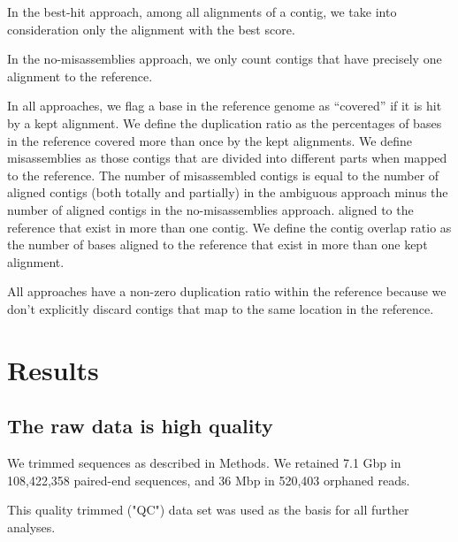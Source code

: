 \documentclass[10pt,a4paper,twocolumn]{article}
\begin{document}
In the best-hit approach, among all alignments of a contig, we take
into consideration only the alignment with the best score.

In the no-misassemblies approach, we only count contigs that have
precisely one alignment to the reference.

In all approaches, we flag a base in the reference genome as
``covered'' if it is hit by a kept alignment.  We define the
duplication ratio as the percentages of bases in the reference covered
more than once by the kept alignments. We define misassemblies as
those contigs that are divided into different parts when mapped to the
reference.  The number of misassembled contigs is equal to the number
of aligned contigs (both totally and partially) in the ambiguous
approach minus the number of aligned contigs in the no-misassemblies
approach.  %
aligned to the reference that exist in more than one contig.  We
define the contig overlap ratio as the number of bases aligned to the
reference that exist in more than one kept alignment.

All approaches have a non-zero duplication ratio within the reference
because we don't explicitly discard contigs that map to the same
location in the reference.

\section*{Results}


 
\subsection*{The raw data is high quality}

We trimmed sequences as described in Methods. We retained 7.1 Gbp in
108,422,358 paired-end sequences, and 36 Mbp in 520,403 orphaned
reads.


This quality trimmed ("QC") data set was used as the basis for all
further analyses.
\end{document}
